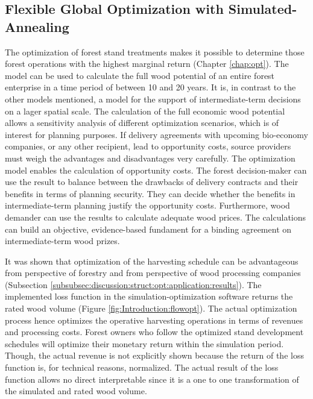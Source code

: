 \subsection{Flexible Global Optimization with Simulated-Annealing}
\label{subsec:discussion:struct:opt}
The optimization of forest stand treatments makes it possible to determine those forest operations with the highest marginal return (Chapter \ref{chap:opt}). The model can be used to calculate the full wood potential of an entire forest enterprise in a time period of between 10 and 20 years. It is, in contrast to the other models mentioned, a model for the support of intermediate-term decisions on a lager spatial scale. The calculation of the full economic wood potential allows a sensitivity analysis of different optimization scenarios, which is of interest for planning purposes. If delivery agreements with upcoming bio-economy companies, or any other recipient, lead to opportunity costs, source providers must weigh the advantages and disadvantages very carefully. The optimization model enables the calculation of opportunity costs. The forest decision-maker can use the result to balance between the drawbacks of delivery contracts and their benefits in terms of planning security. They can decide whether the benefits in intermediate-term planning justify the opportunity costs. Furthermore, wood demander can use the results to calculate adequate wood prices. The calculations can build an objective, evidence-based fundament for a binding agreement on intermediate-term wood prizes.

It was shown that optimization of the harvesting schedule can be advantageous from perspective of forestry and from perspective of wood processing companies (Subsection \ref{subsubsec:discussion:struct:opt:application:results}). The implemented loss function in the simulation-optimization software returns the rated wood volume (Figure \ref{fig:Introduction:flowopt}). The actual optimization process hence optimizes the operative harvesting operations in terms of revenues and processing costs. Forest owners who follow the optimized stand development schedules will optimize their monetary return within the simulation period. Though, the actual revenue is not explicitly shown because the return of the loss function is, for technical reasons, normalized. The actual result of the loss function allows no direct interpretable since it is a one to one transformation of the simulated and rated wood volume.

